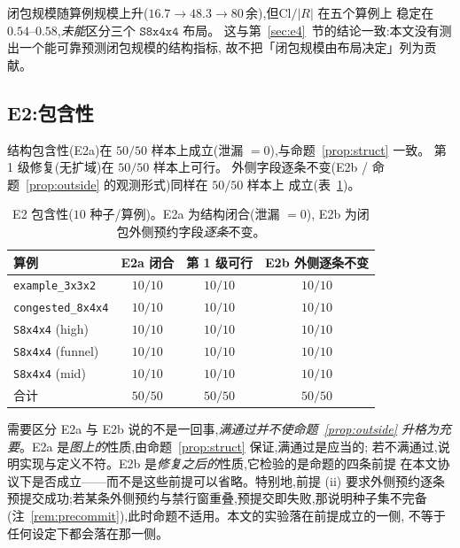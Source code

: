 \documentclass[manuscript,screen,review]{acmart}
\newcommand{\NSeeds}{10}
\newcommand{\NPairs}{50}
\newcommand{\PassClosed}{\NPairs/\NPairs}    %
\newcommand{\PassInvar}{\NPairs/\NPairs}     %
\begin{document}
闭包规模随算例规模上升(\(16.7\to 48.3\to 80\)\,余),但\(\mathrm{Cl}/|R|\) 在五个算例上
稳定在 \(0.54\)--\(0.58\),\emph{未能}区分三个 \(\texttt{S8x4x4}\) 布局。
这与第~\ref{sec:e4}~节的结论一致:本文没有测出一个能可靠预测闭包规模的结构指标,
故不把「闭包规模由布局决定」列为贡献。

\subsection{E2:包含性}
\label{sec:e2}

结构包含性(E2a)在 \(\PassClosed\) 样本上成立(泄漏 \(=0\)),与命题~\ref{prop:struct} 一致。
第 1 级修复(无扩域)在 \(\NPairs/\NPairs\) 样本上可行。
外侧字段逐条不变(E2b / 命题~\ref{prop:outside} 的观测形式)同样在 \(\PassInvar\) 样本上
成立(表~\ref{tab:e2})。

\begin{table}[t]
\centering
\caption{E2 包含性(\(\NSeeds\) 种子/算例)。E2a 为结构闭合(泄漏 \(=0\)),
E2b 为闭包外侧预约字段\emph{逐条}不变。}
\label{tab:e2}
\small
\begin{tabular}{@{}lccc@{}}
\toprule
算例 & E2a 闭合 & 第 1 级可行 & E2b 外侧逐条不变 \\
\midrule
\texttt{example\_3x3x2}   & \(10/10\) & \(10/10\) & \(10/10\) \\
\texttt{congested\_8x4x4} & \(10/10\) & \(10/10\) & \(10/10\) \\
\texttt{S8x4x4} (high)    & \(10/10\) & \(10/10\) & \(10/10\) \\
\texttt{S8x4x4} (funnel)  & \(10/10\) & \(10/10\) & \(10/10\) \\
\texttt{S8x4x4} (mid)     & \(10/10\) & \(10/10\) & \(10/10\) \\
\midrule
合计 & \(\PassClosed\) & \(\NPairs/\NPairs\) & \(\PassInvar\) \\
\bottomrule
\end{tabular}
\end{table}

需要区分 E2a 与 E2b 说的不是一回事,\emph{满通过并不使命题~\ref{prop:outside}
升格为充要}。E2a 是\emph{图上的}性质,由命题~\ref{prop:struct} 保证,满通过是应当的;
若不满通过,说明实现与定义不符。E2b 是\emph{修复之后的}性质,它检验的是命题的四条前提
在本文协议下是否成立——而不是这些前提可以省略。特别地,前提 (ii) 要求外侧预约逐条
预提交成功;若某条外侧预约与禁行窗重叠,预提交即失败,那说明种子集不完备
(注~\ref{rem:precommit}),此时命题不适用。本文的实验落在前提成立的一侧,
不等于任何设定下都会落在那一侧。
\end{document}

